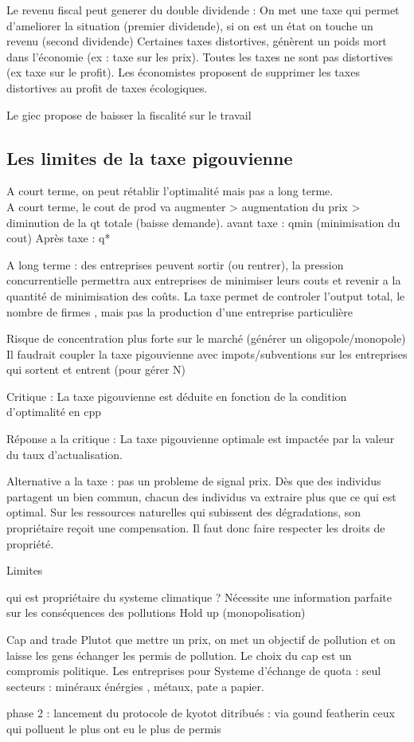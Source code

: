 \documentclass{article}
\begin{document}
Le revenu fiscal peut generer du double dividende : On met une taxe qui permet d'ameliorer la situation (premier dividende), si on est un état on touche un revenu (second dividende)
Certaines taxes distortives, génèrent un poids mort dans l'économie (ex : taxe sur les prix). Toutes les taxes ne sont pas distortives (ex taxe sur le profit).
Les économistes proposent de supprimer les taxes distortives au profit de taxes écologiques.

Le giec propose de baisser la fiscalité sur le travail

\subsection{Les limites de la taxe pigouvienne}
A court terme, on peut rétablir l'optimalité mais pas a long terme. \\
A court terme, le cout de prod va augmenter > augmentation du prix > diminution de la qt totale (baisse demande).
avant taxe : qmin (minimisation du cout)
Après taxe : q*

A long terme : des entreprises peuvent sortir (ou rentrer), la pression concurrentielle permettra aux entreprises de minimiser leurs couts et revenir a la quantité de minimisation des coûts.
La taxe permet de controler l'output total, le nombre de firmes , mais pas la production d'une entreprise particulière 

Risque de concentration plus forte sur le marché (générer un oligopole/monopole)
Il faudrait coupler la taxe pigouvienne avec impots/subventions sur les entreprises qui sortent et entrent (pour gérer N)

Critique : 
La taxe pigouvienne est déduite en fonction de la condition d'optimalité en cpp

Réponse a la critique : La taxe pigouvienne optimale est impactée par la valeur du taux d'actualisation.


Alternative a la taxe : 
pas un probleme de signal prix.
Dès que des individus partagent un bien commun, chacun des individus va extraire plus que ce qui est optimal.
Sur les ressources naturelles qui subissent des dégradations, son propriétaire reçoit une compensation.
Il faut donc faire respecter les droits de propriété.

Limites

qui est propriétaire du systeme climatique ?
Nécessite une information parfaite sur les conséquences des pollutions
Hold up (monopolisation)

Cap and trade 
Plutot que mettre un prix, on met un objectif de pollution et on laisse les gens échanger les permis de pollution.
Le choix du cap est un compromis politique.
Les entreprises pour
Systeme d'échange de quota : seul secteurs : minéraux énérgies , métaux, pate a papier.
 
phase 2 : lancement du protocole de kyotot
ditribués : via gound featherin
ceux qui polluent le plus ont eu le plus de permis
\end{document}
